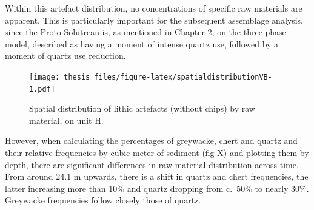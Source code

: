 \documentclass[12pt,twoside]{reedthesis}
\begin{document}
Within this artefact distribution, no concentrations of specific raw materials are apparent. This is particularly important for the subsequent assemblage analysis, since the Proto-Solutrean is, as mentioned in Chapter 2, on the three-phase model, described as having a moment of intense quartz use, followed by a moment of quartz use reduction.
\begin{figure}
\centering
\texttt{[image: thesis\_files/figure-latex/spatialdistributionVB-1.pdf]}
\caption{\label{fig:spatialdistributionVB}Spatial distribution of lithic artefacts (without chips) by raw material, on unit H.}
\end{figure}
However, when calculating the percentages of greywacke, chert and quartz and their relative frequencies by cubic meter of sediment (fig X) and plotting them by depth, there are significant differences in raw material distribution across time. From around 24.1 m upwards, there is a shift in quartz and chert frequencies, the latter increasing more than 10\% and quartz dropping from c.~50\% to nearly 30\%. Greywacke frequencies follow closely those of quartz.
\end{document}
